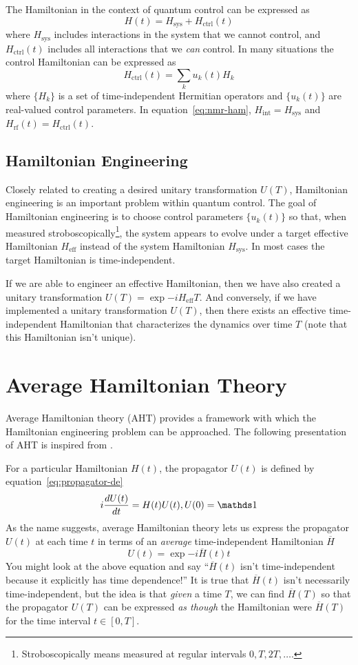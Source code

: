 The Hamiltonian in the context of quantum control can be expressed as
\begin{equation}
    H(t) = H_{\text{sys}} + H_{\text{ctrl}}(t)
\end{equation}
where $H_{\text{sys}}$ includes interactions in the system that we cannot control, and $H_{\text{ctrl}}(t)$ includes all interactions that we \emph{can} control. In many situations the control Hamiltonian can be expressed as
\[
H_{\text{ctrl}}(t) = \sum_k u_k(t) H_k
\]
where $\{H_k\}$ is a set of time-independent Hermitian operators and $\{u_k(t)\}$ are real-valued control parameters. In equation~\ref{eq:nmr-ham}, $H_{\text{int}} = H_{\text{sys}}$  and $H_{\text{rf}}(t) = H_{\text{ctrl}}(t)$.

\subsection{Hamiltonian Engineering}

Closely related to creating a desired unitary transformation $U(T)$, Hamiltonian engineering is an important problem within quantum control. The goal of Hamiltonian engineering is to choose control parameters $\{u_k(t)\}$ so that, when measured stroboscopically\footnote{Stroboscopically means measured at regular intervals $0, T, 2T, \dots$.}, the system appears to evolve under a target effective Hamiltonian $H_{\text{eff}}$ instead of the system Hamiltonian $H_{\text{sys}}$. In most cases the target Hamiltonian is time-independent.

If we are able to engineer an effective Hamiltonian, then we have also created a unitary transformation $U(T) = \exp{-i H_{\text{eff}} T}$. And conversely, if we have implemented a unitary transformation $U(T)$, then there exists an effective time-independent Hamiltonian that characterizes the dynamics over time $T$ (note that this Hamiltonian isn't unique).

\section{Average Hamiltonian Theory}\label{sec:AHT}

Average Hamiltonian theory (AHT) provides a framework with which the Hamiltonian engineering problem can be approached. The following presentation of AHT is inspired from \cite{brinkmann_2016, gerstein-dybowski, 1976ii}.

For a particular Hamiltonian $H(t)$, the propagator $U(t)$ is defined by equation~\ref{eq:propagator-de}
\[
i \ddt{U(t)} = H(t) U(t), U(0) = \identity
\]
As the name suggests, average Hamiltonian theory lets us express the propagator $U(t)$ at each time $t$ in terms of an \emph{average} time-independent Hamiltonian $\overline{H}$
\[
U(t) = \exp{-i \overline{H}(t) t}
\]
You might look at the above equation and say ``$\overline{H}(t)$ isn't time-independent because it explicitly has time dependence!'' It is true that $\overline{H}(t)$ isn't necessarily time-independent, but the idea is that \emph{given} a time $T$, we can find $\overline{H}(T)$ so that the propagator $U(T)$ can be expressed \emph{as though} the Hamiltonian were $\overline{H}(T)$ for the time interval $t \in [0, T]$.

